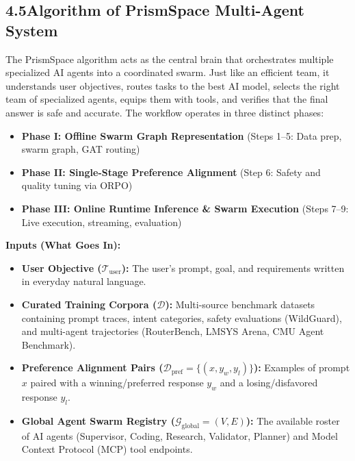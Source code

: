 \documentclass[11pt,a4paper]{article}
\begin{document}

\subsection*{4.5\quad Algorithm of PrismSpace Multi-Agent System}

The PrismSpace algorithm acts as the central brain that orchestrates multiple specialized AI agents into a coordinated swarm. Just like an efficient team, it understands user objectives, routes tasks to the best AI model, selects the right team of specialized agents, equips them with tools, and verifies that the final answer is safe and accurate. The workflow operates in three distinct phases:
\begin{itemize}[leftmargin=1.5em, itemsep=0.12em, topsep=0.04em]
    \item \textbf{Phase I: Offline Swarm Graph Representation} (Steps 1--5: Data prep, swarm graph, GAT routing)
    \item \textbf{Phase II: Single-Stage Preference Alignment} (Step 6: Safety and quality tuning via ORPO)
    \item \textbf{Phase III: Online Runtime Inference \& Swarm Execution} (Steps 7--9: Live execution, streaming, evaluation)
\end{itemize}

\vspace{0.25em}
\textbf{Inputs (What Goes In):}
\begin{itemize}[leftmargin=1.5em, itemsep=0.18em, topsep=0.04em]
    \item \textbf{User Objective ($\mathcal{T}_{\text{user}}$):} The user's prompt, goal, and requirements written in everyday natural language.
    \item \textbf{Curated Training Corpora ($\mathcal{D}$):} Multi-source benchmark datasets containing prompt traces, intent categories, safety evaluations (WildGuard), and multi-agent trajectories (RouterBench, LMSYS Arena, CMU Agent Benchmark).
    \item \textbf{Preference Alignment Pairs ($\mathcal{D}_{\text{pref}} = \{(x, y_w, y_l)\}$):} Examples of prompt $x$ paired with a winning/preferred response $y_w$ and a losing/disfavored response $y_l$.
    \item \textbf{Global Agent Swarm Registry ($\mathcal{G}_{\text{global}} = (V, E)$):} The available roster of AI agents (Supervisor, Coding, Research, Validator, Planner) and Model Context Protocol (MCP) tool endpoints.
\end{itemize}
\end{document}
